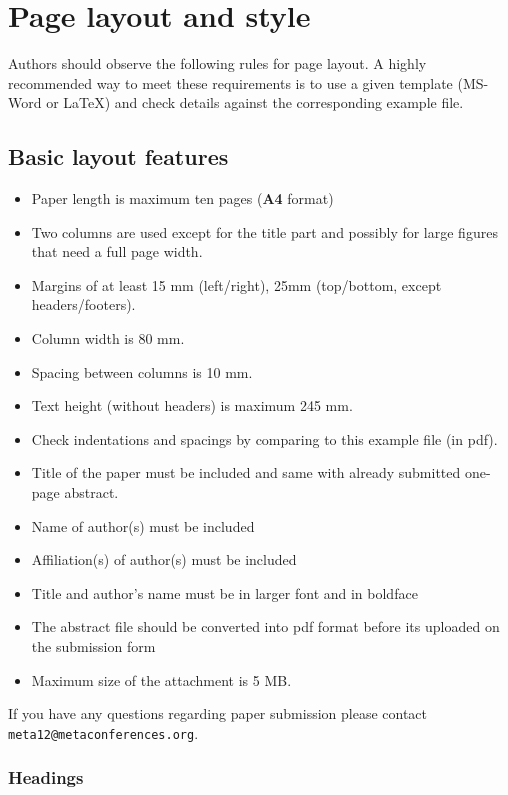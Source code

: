 \documentclass{article}
\begin{document}
\section{Page layout and style}

Authors should observe the following rules for page layout. 
A highly recommended way to meet these requirements is to use a given template (MS-Word or \LaTeX) and check details against the corresponding example file.

\subsection{Basic layout features}

\begin{itemize}
\setlength{\itemsep}{-1mm}
\item Paper length is maximum ten pages ({\bf A4} format)
\item Two columns are used except for the title part and possibly for large figures that need a full page width.
\item Margins of at least 15 mm (left/right), 25mm (top/bottom, except headers/footers).
\item Column width is 80 mm.
\item Spacing between columns is 10 mm.
\item Text height (without headers) is maximum 245 mm.
\item Check indentations and spacings by comparing to this example file (in pdf).
\item Title of the paper must be included and same with already submitted one-page abstract.
\item Name of author(s) must be included
\item Affiliation(s) of author(s) must be included
\item Title and author's name must be in larger font and in boldface
\item The abstract file should be converted into pdf format before its uploaded on the submission form
\item Maximum size of the attachment is 5 MB.
\end{itemize}

If you have any questions regarding paper submission please contact {\tt \small meta12@metaconferences.org}. 

\subsubsection{Headings}
\end{document}
